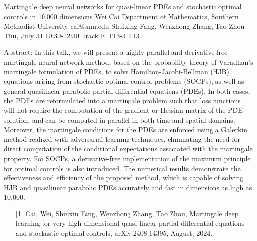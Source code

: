 \begin{talk}
  {Martingale deep neural networks for quasi-linear PDEs and stochastic optimal controls in 10,000 dimensions}%
  {Wei Cai}%
  {Department of Mathematics, Southern Methodist University}%
  {cai@smu.edu}%
  {Shuixing Fang, Wenzhong Zhang, Tao Zhou}%
  {}%
  {Thu, July 31 10:30-12:30 Track E}%
  {T13-3}%
  {T13}%
			
Abstract: In this talk, we will present a highly parallel and derivative-free martingale neural network method, based on the probability theory of Varadhan’s martingale formulation of PDEs, to solve Hamilton-Jacobi-Bellman (HJB) equations arising from stochastic optimal control problems (SOCPs), as well as general quasilinear parabolic partial differential equations (PDEs). In both cases, the PDEs are reformulated into a martingale problem such that loss functions will not require the computation of the gradient or Hessian matrix of the PDE solution, and can be computed in parallel in both time and spatial domains. Moreover, the martingale conditions for the PDEs are enforced using a Galerkin method realized with adversarial learning techniques, eliminating the need for direct computation of the conditional expectations associated with the martingale property. For SOCPs, a derivative-free implementation of the maximum principle for optimal controls is also introduced. The numerical results demonstrate the effectiveness and efficiency of the proposed method, which is capable of solving HJB and quasilinear parabolic PDEs accurately and fast in dimensions as high as 10,000.

\medskip

\begin{enumerate}
	\item[{[1]}] Cai,  Wei, Shuixin Fang, Wenzhong Zhang, Tao Zhou, Martingale deep learning for very high dimensional quasi-linear partial differential equations and stochastic optimal controls,  arXiv:2408.14395, August, 2024. 
\end{enumerate}

 
\end{talk}
